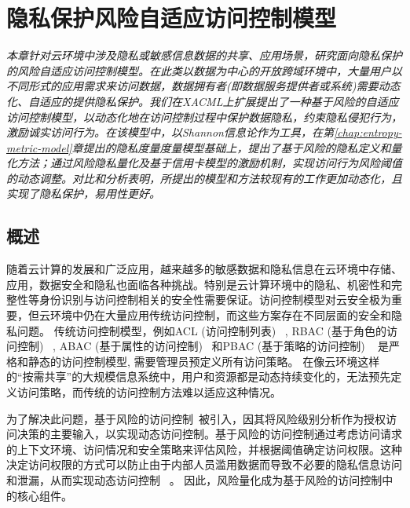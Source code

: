 \chapter{隐私保护风险自适应访问控制模型}
\label{chap:RaBAC-for-privacy}

\textit{ }

\textit{本章针对云环境中涉及隐私或敏感信息数据的共享、应用场景，研究面向隐私保护的风险自适应访问控制模型。在此类以数据为中心的开放跨域环境中，大量用户以不同形式的应用需求来访问数据，数据拥有者(即数据服务提供者或系统)需要动态化、自适应的提供隐私保护。我们在XACML上扩展提出了一种基于风险的自适应访问控制模型，以动态化地在访问控制过程中保护数据隐私，约束隐私侵犯行为，激励诚实访问行为。在该模型中，以Shannon信息论作为工具，在第\ref{chap:entropy-metric-model}章提出的隐私度量度量模型基础上，提出了基于风险的隐私定义和量化方法；通过风险隐私量化及基于信用卡模型的激励机制，实现访问行为风险阈值的动态调整。对比和分析表明，所提出的模型和方法较现有的工作更加动态化，且实现了隐私保护，易用性更好。
}
\section{概述}
\label{sec:intro}
随着云计算的发展和广泛应用，越来越多的敏感数据和隐私信息在云环境中存储、应用，数据安全和隐私也面临各种挑战。特别是云计算环境中的隐私、机密性和完整性等身份识别与访问控制相关的安全性需要保证。访问控制模型对云安全极为重要，但云环境中仍在大量应用传统访问控制，而这些方案存在不同层面的安全和隐私问题。
传统访问控制模型，例如ACL (访问控制列表) ~\cite{qian2001acla}, RBAC (基于角色的访问控制) ~\cite{jung2012cribac}, ABAC (基于属性的访问控制) ~\cite{zhang2011attribute}和PBAC (基于策略的访问控制) ~\cite{huang2011policy} 是严格和静态的访问控制模型, 需要管理员预定义所有访问策略。 在像云环境这样的“按需共享”的大规模信息系统中，用户和资源都是动态持续变化的，无法预先定义访问策略，而传统的访问控制方法难以适应这种情况。

为了解决此问题，基于风险的访问控制~\cite{ni2010risk,shaikh2012dynamic,wang2011quantified,choi2015framework}被引入，因其将风险级别分析作为授权访问决策的主要输入，以实现动态访问控制。基于风险的访问控制通过考虑访问请求的上下文环境、访问情况和安全策略来评估风险，并根据阈值确定访问权限。这种决定访问权限的方式可以防止由于内部人员滥用数据而导致不必要的隐私信息访问和泄漏，从而实现动态访问控制 ~\cite{chen2011risk}。 因此，风险量化成为基于风险的访问控制中的核心组件。

